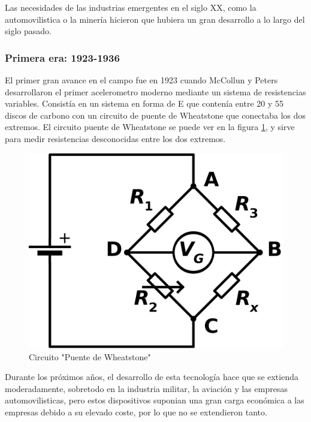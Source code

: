\documentclass[12pt]{article}
\numberwithin{equation}{section}
\begin{document}
Las necesidades de las industrias emergentes en el siglo XX, como la automovilistica o la minería hicieron que hubiera un gran desarrollo a lo largo del siglo pasado.

\subsubsection{Primera era: 1923-1936}

El primer gran avance en el campo fue en 1923 cuando McCollun y Peters\cite{6534032} desarrollaron el primer acelerometro moderno mediante un sistema de resistencias variables. Consistía en un sistema en forma de E que contenía entre 20 y 55 discos de carbono con un circuito de puente de Wheatstone que conectaba los dos extremos. El circuito puente de Wheatstone se puede ver en la figura \ref{fig:wheatstone}, y sirve para medir resistencias desconocidas entre los dos extremos.

\begin{figure}[h]
    \centering
    \includegraphics[scale=0.2]{1200px-Wheatstonebridge.png}
    \caption{Circuito "Puente de Wheatstone"}
    \label{fig:wheatstone}
\end{figure}

Durante los próximos años, el desarrollo de esta tecnología hace que se extienda moderadamente, sobretodo en la industria militar, la aviación y las empresas automovilisticas, pero estos dispositivos suponian una gran carga económica a las empresas debido a su elevado coste, por lo que no se extendieron tanto.
\end{document}
